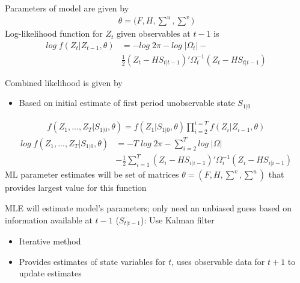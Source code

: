 \documentclass{beamer}
\begin{document}
\begin{frame}
  Parameters of model are given by 
  \begin{align}
    \theta=(F,H,\scriptstyle \sum^u,\sum^v \textstyle)
  \end{align}
  Log-likelihood function for $Z_t$ given observables at $t-1$ is  
  \begin{align}
    log\;f(Z_t|Z_{t-1},\theta)&= -log\; 2\pi -log\;|\Omega_t|- \\ \nonumber &\frac{1}{2}(Z_t-HS_{t|t-1})' \Omega_t^{-1}(Z_t-HS_{t|t-1})
  \end{align}  
\end{frame}



\begin{frame}
  Combined likelihood is given by
  \begin{itemize}
    \item Based on initial estimate of first period unobservable state $S_{1|0}$
  \end{itemize}
  \begin{align}
    f(Z_1,...,Z_T|S_{1|0},\theta)=f(Z_1|S_{1|0},\theta)\prod_{i=2}^{i=T}f(Z_i|Z_{i-1},\theta)
  \end{align}
  \begin{align}
    log\;f(Z_1,...,Z_T|S_{1|0}, \theta) &= -T\;log\; 2\pi - \sum^T_{i=2}log\; |\Omega| \\ \nonumber
    &- \frac{1}{2} \sum^T_{i=1} (Z_i-HS_{i|i-1})' \Omega_i^{-1} (Z_i - HS_{i|i-1}) 
  \end{align}
  ML parameter estimates will be set of matrices $\theta=(F,H,\sum^v,\sum^u)$ that provides largest value for this function  
\end{frame}

\begin{frame}
  MLE will estimate model's parameters; only need an unbiased guess based on information available at $t-1$ ($S_{t|t-1}$): Use Kalman filter 
  \begin{itemize}
    \item Iterative method
    \item Provides estimates of state variables for $t$, uses observable data for $t+1$ to update estimates
  \end{itemize}
\end{frame}
\end{document}
